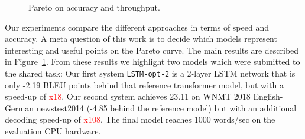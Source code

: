 \documentclass[11pt,a4paper]{article}
\begin{document}
\begin{figure}
\caption{Pareto on accuracy and throughput.}
\label{fig:pareto}
\end{figure}

Our experiments compare the different approaches in terms of speed and
accuracy. A meta question of this work is to decide which models
represent interesting and useful points on the Pareto curve. The main
results are described in Figure~\ref{fig:pareto}.  From these results
we highlight two models which were submitted to the shared task: Our
first system {\tt LSTM-opt-2} is a 2-layer LSTM network that is only
-2.19 BLEU points behind that reference transformer model, but with a
speed-up of \textcolor{red}{x18}. Our second system achieves 23.11 on
WNMT 2018 English-German newstest2014 (-4.85 behind the reference
model) but with an additional decoding speed-up of \textcolor{red}{x108}.
The final model reaches 1000 words/sec on the evaluation CPU hardware.

\end{document}
